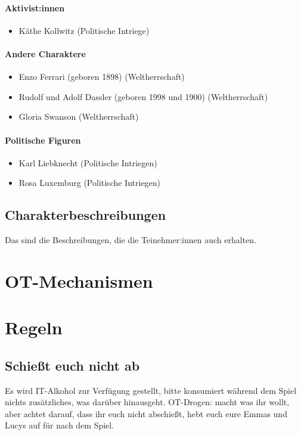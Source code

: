\documentclass[12pt, a4paper, openany]{report}
\begin{document}
\subsubsection{Aktivist:innen}
\begin{itemize}
	\item Käthe Kollwitz (Politische Intriege)
\end{itemize}

\subsubsection{Andere Charaktere}
\begin{itemize}
	\item Enzo Ferrari (geboren 1898) (Weltherrschaft)
	\item Rudolf und Adolf Dassler (geboren 1998 und 1900) (Weltherrschaft)
	\item Gloria Swanson (Weltherrschaft)
\end{itemize}

\subsubsection{Politische Figuren}
\begin{itemize}
	\item Karl Liebknecht (Politische Intriegen)
	\item Rosa Luxemburg (Politische Intriegen)
\end{itemize}

\section{Charakterbeschreibungen}
Das sind die Beschreibungen, die die Teinehmer:innen auch erhalten.

\chapter{OT-Mechanismen}

\chapter{Regeln}
\section{Schießt euch nicht ab}
Es wird IT-Alkohol zur Verfügung gestellt, bitte konsumiert während dem Spiel nichts zusätzliches, was darüber hinausgeht.
OT-Drogen: macht was ihr wollt, aber achtet darauf, dass ihr euch nicht abschießt, hebt euch eure Emmas und Lucys auf für nach dem Spiel.
\end{document}
